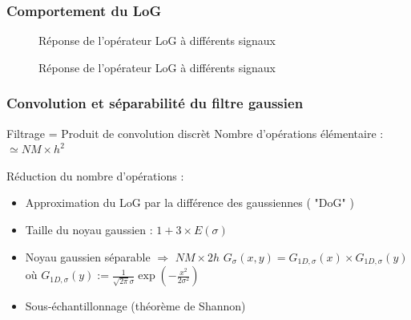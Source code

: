 \documentclass{beamer}
\begin{document}
\begin{frame}
	\frametitle{Comportement du LoG}
	\begin{figure}
		\subfloat[Réponse à un créneau pour $\sigma=1$, $\sigma=2$ et $\sigma=3$]{\scalebox{0.3}{}}
		\caption{Réponse de l'opérateur LoG à différents signaux}
	\end{figure}
\end{frame}

\begin{frame}
	\begin{figure}
		\subfloat[Réponses à des créneaux pour $\sigma=1$]{\scalebox{0.3}{}}
		\caption{Réponse de l'opérateur LoG à différents signaux}
	\end{figure}
\end{frame}

\begin{frame}
	\frametitle{Convolution et séparabilité du filtre gaussien}
	\begin{center}
	Filtrage = Produit de convolution discrèt
	Nombre d'opérations élémentaire : $\simeq NM \times h^{2}$\\
	\end{center}

	Réduction du nombre d'opérations :  
	\begin{itemize}
		\item Approximation du LoG par la différence des gaussiennes ( "DoG" ) 
		\item Taille du noyau gaussien : $1 + 3 \times E(\sigma)$
		\item Noyau gaussien séparable $\Rightarrow$ $NM \times 2h$ 
		$G_{\sigma}(x,y)=G_{1D, \sigma}(x) \times G_{1D, \sigma}(y)$ o\`{u} $G_{1D, \sigma}(y) := \frac{1}{\sqrt{2\pi}\sigma}\exp(-\frac{x^{2}}{2\sigma^{2}})$
		\item Sous-échantillonnage (théorème de Shannon) 
	\end{itemize}

\end{frame}
\end{document}
